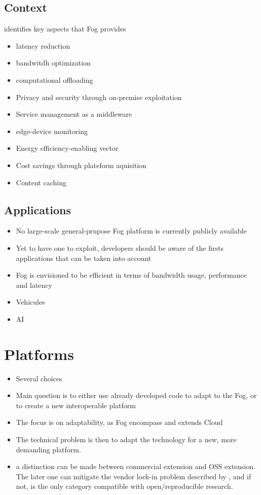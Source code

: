 \documentclass[11pt]{sdm}
\begin{document}
\subsection {Context}
\citet{ahmed_fog_2019} identifies key aspects that Fog provides
\begin{itemize}
	\item latency reduction
	\item bandwitdh optimization
	\item computational offloading
	\item Privacy and security through on-premise exploitation
	\item Service management as a middleware
	\item edge-device monitoring
	\item Energy efficiency-enabling vector
	\item Cost savings through plateform aquisition
	\item Content caching
\end{itemize}
\subsection {Applications}
\begin{itemize}
	\item No large-scale general-prupose Fog platform is currently publicly available \cite{ahmed_fog_2019}
	\item Yet to have one to exploit, developers should be aware of the firsts applications that can be taken into account
	\item Fog is envisioned to be efficient in terms of bandwidth usage, performance and latency
\end{itemize}
\begin{itemize}
    \item Vehicules
    \item \gls{AI}
\end{itemize}

\section{Platforms}
\begin{itemize}
    \item Several choices
    \item Main question is to either use already developed code to adapt to the Fog, or to create a new interoperable platform
    \item The focus is on adaptability, as Fog encompass and extends Cloud
    \item The technical problem is then to adapt the technology for a new, more demanding platform.
    \item a distinction can be made between commercial extension and \gls{OSS} extension. The later one can mitigate the vendor lock-in problem described by \citet{kjorveziroski_iot_2021}, and if not, is the only category compatible with open/reproducible research.
\end{itemize}
\end{document}
